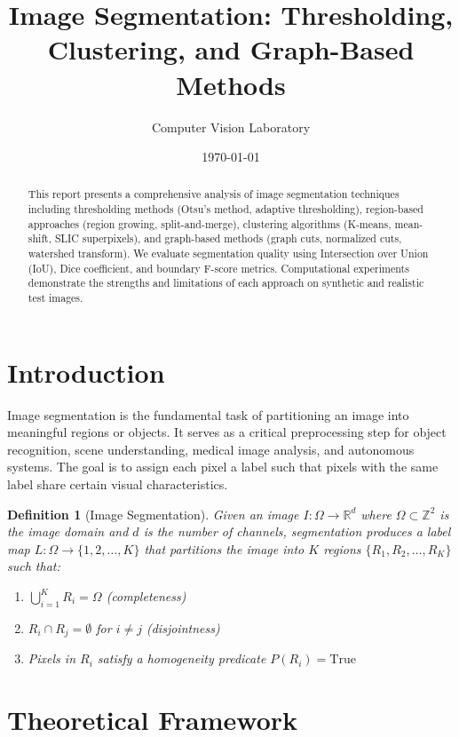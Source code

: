 \documentclass[a4paper, 11pt]{article}
\title{Image Segmentation: Thresholding, Clustering, and Graph-Based Methods}
\author{Computer Vision Laboratory}
\date{\today}
\newtheorem{definition}{Definition}[section]
\begin{document}
\maketitle

\begin{abstract}
This report presents a comprehensive analysis of image segmentation techniques including
thresholding methods (Otsu's method, adaptive thresholding), region-based approaches
(region growing, split-and-merge), clustering algorithms (K-means, mean-shift, SLIC
superpixels), and graph-based methods (graph cuts, normalized cuts, watershed transform).
We evaluate segmentation quality using Intersection over Union (IoU), Dice coefficient,
and boundary F-score metrics. Computational experiments demonstrate the strengths and
limitations of each approach on synthetic and realistic test images.
\end{abstract}

\section{Introduction}

Image segmentation is the fundamental task of partitioning an image into meaningful regions
or objects. It serves as a critical preprocessing step for object recognition, scene
understanding, medical image analysis, and autonomous systems. The goal is to assign each
pixel a label such that pixels with the same label share certain visual characteristics.

\begin{definition}[Image Segmentation]
Given an image $I: \Omega \rightarrow \mathbb{R}^d$ where $\Omega \subset \mathbb{Z}^2$
is the image domain and $d$ is the number of channels, segmentation produces a label map
$L: \Omega \rightarrow \{1, 2, \ldots, K\}$ that partitions the image into $K$ regions
$\{R_1, R_2, \ldots, R_K\}$ such that:
\begin{enumerate}
\item $\bigcup_{i=1}^K R_i = \Omega$ (completeness)
\item $R_i \cap R_j = \emptyset$ for $i \neq j$ (disjointness)
\item Pixels in $R_i$ satisfy a homogeneity predicate $P(R_i) = \text{True}$
\end{enumerate}
\end{definition}

\section{Theoretical Framework}
\end{document}
